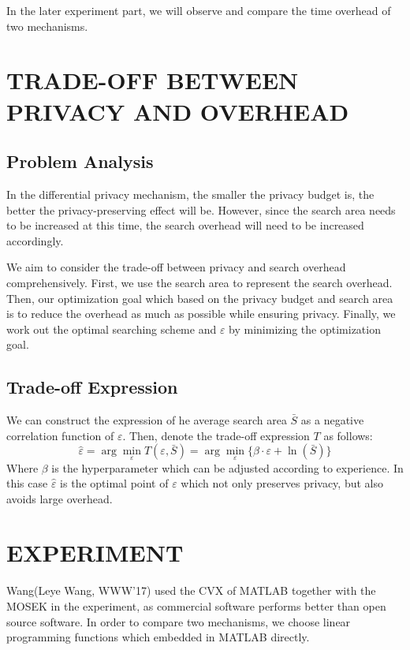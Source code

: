 In the later experiment part, we will observe and compare the time overhead of two mechanisms.

\section{TRADE-OFF BETWEEN PRIVACY AND OVERHEAD} %
\subsection{Problem Analysis} %
In the differential privacy mechanism, the smaller the privacy budget is, the better the privacy-preserving effect will be. However, since the search area needs to be increased at this time, the search overhead will need to be increased accordingly.

We aim to consider the trade-off between privacy and search overhead comprehensively. First, we use the search area to represent the search overhead. Then, our optimization goal which based on the privacy budget and search area is to reduce the overhead as much as possible while ensuring privacy. Finally, we work out the optimal searching scheme and $\varepsilon$ by minimizing the optimization goal.

\subsection{Trade-off Expression} %
We can construct the expression of he average search area $\bar{S}$ as a negative correlation function of $\varepsilon$. Then, denote the trade-off expression $T$ as follows:
$$
	\hat{\varepsilon}=\arg \min_\varepsilon T(\varepsilon , \bar{S})=\arg \min_\varepsilon \{ \beta \cdot \varepsilon + \ln (\bar{S}) \}
$$
Where $\beta$ is the hyperparameter which can be adjusted according to experience. In this case $\hat{\varepsilon}$ is the optimal point of $\varepsilon$ which not only preserves privacy, but also avoids large overhead.

\section{EXPERIMENT} %
Wang(Leye Wang, WWW’17) used the CVX of MATLAB together with the MOSEK in the experiment, as commercial software performs better than open source software. In order to compare two mechanisms, we choose linear programming functions which embedded in MATLAB directly.

